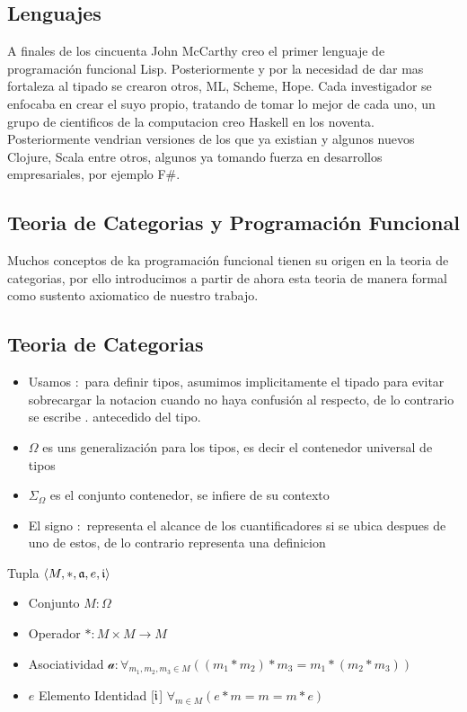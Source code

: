 \subsection{Lenguajes}

A finales de los cincuenta John McCarthy creo el primer lenguaje de programación funcional Lisp. Posteriormente y por la necesidad de dar mas fortaleza al tipado se crearon otros, ML, Scheme, Hope. Cada investigador se enfocaba en crear el suyo propio, tratando de tomar lo mejor de cada uno, un grupo de cientificos de la computacion creo Haskell en los noventa. Posteriormente vendrian versiones de los que ya existian y algunos nuevos Clojure, Scala entre otros, algunos ya tomando fuerza en desarrollos empresariales, por ejemplo F\#.

\subsection{Teoria de Categorias y Programación Funcional}

Muchos conceptos de ka programación funcional tienen su origen en la teoria de categorias, por ello introducimos a partir de ahora esta teoria de manera formal como sustento axiomatico de nuestro trabajo.

\subsection{Teoria de Categorias}

\begin{note}\end{note}
\begin{itemize}
\item Usamos $:$ para definir tipos, asumimos implicitamente el tipado para evitar sobrecargar la notacion cuando no haya confusión al respecto, de lo contrario se escribe $.$ antecedido del tipo.
\item $\Omega$ es uns generalización para los tipos, es decir el contenedor universal de tipos
\item $\Sigma_{\Omega}$ es el conjunto contenedor, se infiere de su contexto
\item El signo $:$ representa el alcance de los cuantificadores si se ubica despues de uno de estos, de lo contrario representa una definicion
\end{itemize}

\begin{defn}[Monoide]
\end{defn}
Tupla $\langle M, *, \mathfrak{a}, e, \mathfrak{i} \rangle$ 
\begin{itemize}
\item Conjunto $M: \Omega$
\item Operador $* : M \times M \to M$
\item Asociatividad $\mathcal{a} : \forall_{m_1, m_2, m_3 \in M} ((m_1 * m_2) * m_3 = m_1 * (m_2 * m_3))$
\item $e$ Elemento Identidad [$\mathfrak{i}$] $\forall_{m \in M} ( e * m = m = m * e)$
\end{itemize}

